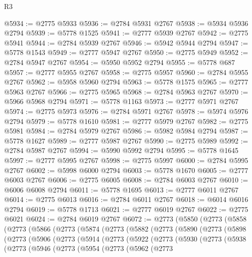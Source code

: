 \begin{lexlean}{R3}
\begin{coremodule}
@5934 := @2775 @5933
@5936 := @2784 @5931 @2767
@5938 := @5934 @5936 @2794
@5939 := @5778 @1525
@5941 := @2777 @5939 @2767
@5942 := @2775 @5941
@5944 := @2784 @5939 @2767
@5946 := @5942 @5944 @2794
@5947 := @5778 @1543
@5949 := @2777 @5947 @2767
@5950 := @2775 @5949
@5952 := @2784 @5947 @2767
@5954 := @5950 @5952 @2794
@5955 := @5778 @687
@5957 := @2777 @5955 @2767
@5958 := @2775 @5957
@5960 := @2784 @5955 @2767
@5962 := @5958 @5960 @2794
@5963 := @5778 @1575
@5965 := @2777 @5963 @2767
@5966 := @2775 @5965
@5968 := @2784 @5963 @2767
@5970 := @5966 @5968 @2794
@5971 := @5778 @1163
@5973 := @2777 @5971 @2767
@5974 := @2775 @5973
@5976 := @2784 @5971 @2767
@5978 := @5974 @5976 @2794
@5979 := @5778 @1610
@5981 := @2777 @5979 @2767
@5982 := @2775 @5981
@5984 := @2784 @5979 @2767
@5986 := @5982 @5984 @2794
@5987 := @5778 @1627
@5989 := @2777 @5987 @2767
@5990 := @2775 @5989
@5992 := @2784 @5987 @2767
@5994 := @5990 @5992 @2794
@5995 := @5778 @1645
@5997 := @2777 @5995 @2767
@5998 := @2775 @5997
@6000 := @2784 @5995 @2767
@6002 := @5998 @6000 @2794
@6003 := @5778 @1670
@6005 := @2777 @6003 @2767
@6006 := @2775 @6005
@6008 := @2784 @6003 @2767
@6010 := @6006 @6008 @2794
@6011 := @5778 @1695
@6013 := @2777 @6011 @2767
@6014 := @2775 @6013
@6016 := @2784 @6011 @2767
@6018 := @6014 @6016 @2794
@6019 := @5778 @1713
@6021 := @2777 @6019 @2767
@6022 := @2775 @6021
@6024 := @2784 @6019 @2767
@6072 := @2773
    (@5850
      (@2773
        (@5858
          (@2773
            (@5866
              (@2773
                (@5874
                  (@2773
                    (@5882
                      (@2773
                        (@5890
                          (@2773
                            (@5898
                              (@2773
                                (@5906
                                  (@2773
                                    (@5914
                                      (@2773
                                        (@5922
                                          (@2773
                                            (@5930
                                              (@2773
                                                (@5938
                                                  (@2773
                                                    (@5946
                                                      (@2773
                                                        (@5954
                                                          (@2773
                                                            (@5962
                                                              (@2773

\end{coremodule}
\end{lexlean}
